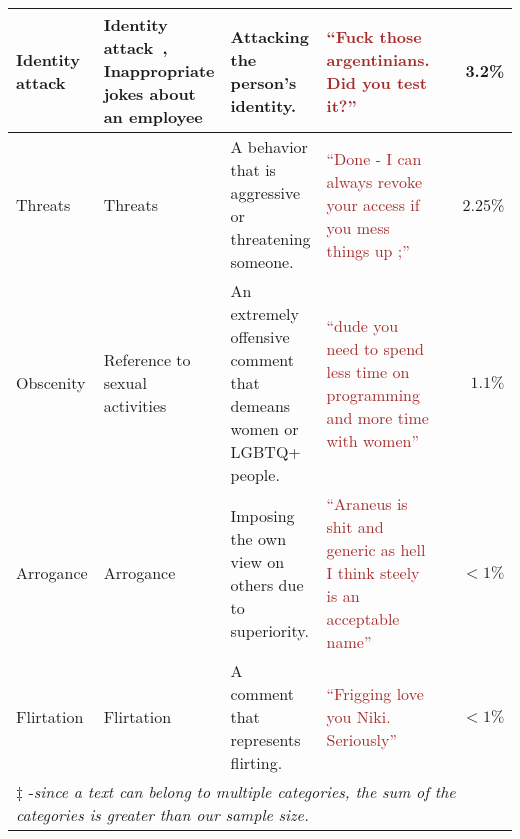 {\begin{tabular}{|p{1.8cm}|p{3.6cm}|p{3.8cm}|p{4cm}|>{\raggedleft\arraybackslash}p{1cm}|r|}
Identity attack & Identity attack~\cite{sarker2022automated}, Inappropriate jokes about an employee~\cite{egelman2020predicting} &  Attacking the person's identity. & \textcolor{brown}{``Fuck those argentinians. Did you test it?''} &17 & 3.2\% \\  \hline

Threats & Threats~\cite{ferreira2021shut,sarker2022automated} & A behavior that is aggressive or threatening someone. & \textcolor{brown}{``Done - I can always revoke your access if you mess things up ;''} &12 & 2.25\% \\  \hline


Obscenity & Reference to sexual activities~\cite{sarker2022automated} &An extremely offensive comment that demeans women or LGBTQ+ people.  & \textcolor{brown}{``dude you need to spend less time on programming and more time with women''} &6& $1.1\%$ \\ \hline 

Arrogance &Arrogance~\cite{miller2022did} & Imposing the own view on others due to superiority. & \textcolor{brown}{``Araneus is shit and generic as hell I think steely is an acceptable name''} &5 & $<1\%$ \\  \hline



Flirtation &Flirtation~\cite{sarker2022automated} & A comment that represents flirting. &  \textcolor{brown}{``Frigging love you Niki. Seriously''} &5 & $<1\%$ \\ \hline 

\multicolumn{6}{l}{$\ddag$ -\textit{since a text can belong to multiple categories, the sum of the categories is greater than our sample size.}}




    \end{tabular}
}